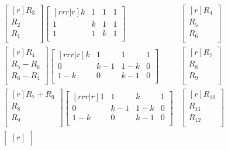 \documentclass{report}
\theoremstyle{plain}
\theoremstyle{definition}
\theoremstyle{plain}
\begin{document}
\begin{enumerate}
\begin{enumerate}
\begin{enumerate}
\begin{align*}
\begin{bmatrix}[r]
		R_3\\ R_2\\ R_1\\
		\end{bmatrix}
		\begin{bmatrix}[rrr|r]
		k & 1 & 1 & 1\\
		1 & k & 1 & 1\\
		1 & 1 & k & 1\\
		\end{bmatrix}&
		\begin{bmatrix}[r]
		R_4\\ R_5\\ R_6\\
		\end{bmatrix}\\
		\begin{bmatrix}[r]
		R_4\\		
		R_5 - R_6\\
		R_6 - R_4\\
		\end{bmatrix}
		\begin{bmatrix}[rrr|r]
		k & 1 & 1 & 1\\
		0 & k-1 & 1-k & 0\\
		1-k & 0 & k-1 & 0\\
		\end{bmatrix}&
		\begin{bmatrix}[r]
		R_7\\ R_8\\ R_9\\
		\end{bmatrix}\\
		\begin{bmatrix}[r]
		R_7 + R_9\\
		R_8\\
		R_9\\
		\end{bmatrix}
		\begin{bmatrix}[rrr|r]
		1 & 1 & k & 1\\
		0 & k-1 & 1-k & 0\\
		1-k & 0 & k-1 & 0\\
		\end{bmatrix}&
		\begin{bmatrix}[r]
		R_{10}\\ R_{11}\\ R_{12}\\
		\end{bmatrix}\\
		\begin{bmatrix}[r]

\end{bmatrix}
\end{align*}
\end{enumerate}
\end{enumerate}
\end{enumerate}
\end{document}
